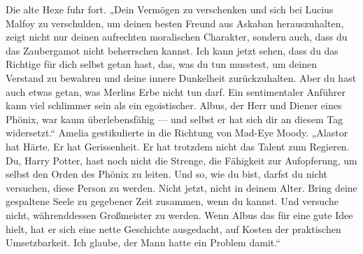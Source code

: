 Die alte Hexe fuhr fort.
„Dein Vermögen zu verschenken und sich bei Lucius Malfoy zu verschulden, um deinen besten Freund aus Askaban herauszuhalten, zeigt nicht nur deinen aufrechten moralischen Charakter, sondern auch, dass du das Zaubergamot nicht beherrschen kannst. Ich kann jetzt sehen, dass du das Richtige für dich selbst getan hast, das, was du tun musstest, um deinen Verstand zu bewahren und deine innere Dunkelheit zurückzuhalten. Aber du hast auch etwas getan, was Merlins Erbe nicht tun darf. Ein sentimentaler Anführer kann viel schlimmer sein als ein egoistischer. Albus, der Herr und Diener eines Phönix, war kaum überlebensfähig — und selbst er hat sich dir an diesem Tag widersetzt.“
Amelia gestikulierte in die Richtung von Mad-Eye Moody.
„Alastor hat Härte. Er hat Gerissenheit. Er hat trotzdem nicht das Talent zum Regieren. Du, Harry Potter, hast noch nicht die Strenge, die Fähigkeit zur Aufopferung, um selbst den Orden des Phönix zu leiten. Und so, wie du bist, darfst du nicht versuchen, diese Person zu werden. Nicht jetzt, nicht in deinem Alter. Bring deine gespaltene Seele zu gegebener Zeit zusammen, wenn du kannst. Und versuche nicht, währenddessen Großmeister zu werden. Wenn Albus das für eine gute Idee hielt, hat er sich eine nette Geschichte ausgedacht, auf Kosten der praktischen Umsetzbarkeit. Ich glaube, der Mann hatte ein Problem damit.“

